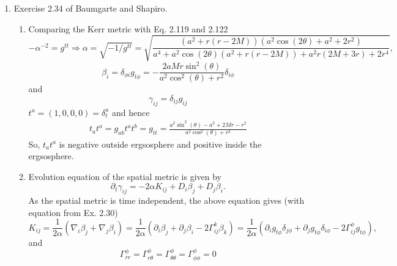 \documentclass[10pt]{article}
\begin{document}
\begin{enumerate}
\item Exercise 2.34 of Baumgarte and Shapiro.\\
  \begin{enumerate}
  \item Comparing the Kerr metric with Eq. 2.119 and 2.122 
    \begin{equation}
      \label{eq:metric-in-alpha-beta}
      -\alpha^{-2} = g^{tt} \Rightarrow \alpha = \sqrt{-1/g^{tt}} = \sqrt{\frac{\left(a^2+r (r-2 M)\right) \left(a^2 \cos (2 \theta )+a^2+2 r^2\right)}{a^4+a^2 \cos (2 \theta ) \left(a^2+r (r-2 M)\right)+a^2 r (2 M+3 r)+2 r^4}},
    \end{equation}
    \begin{equation}
      \label{eq:beta}
      \beta_i = \delta_{\phi i} g_{t\phi} = -\frac{2 a M r \sin ^2(\theta )}{a^2 \cos ^2(\theta )+r^2}\delta_{i\phi}
    \end{equation}
    and
    \begin{equation}
      \label{eq:gamma}
      \gamma_{ij} = \delta_{ij}g_{ij}
    \end{equation}
    $t^a = (1, 0, 0, 0) = \delta^a_t$ and hence
    \begin{align}
      \label{eq:tnorm}
      t_at^a = g_{ab}t^at^b = g_{tt} = \frac{a^2 \sin ^2(\theta )-a^2+2 M r-r^2}{a^2 \cos ^2(\theta )+r^2}
    \end{align}
    So, $t_at^a$ is negative outside ergsosphere and positive inside the ergsosphere.
  \item Evolution equation of the spatial metric is given by
    \begin{equation}
      \label{eq:evolution-of-spatial-metric}
      \partial_t\gamma_{ij} = -2\alpha K_{ij} + D_i\beta_j + D_j\beta_i.
    \end{equation}
    As the spatial metric is time independent, the above equation gives (with equation from Ex. 2.30)
    \begin{equation}
      \label{eq:extrinsic-metric}
      K_{ij} = \frac{1}{2\alpha}(\nabla_i\beta_j + \nabla_j\beta_i) = \frac{1}{2\alpha}(\partial_i\beta_j + \partial_j\beta_i - 2 \Gamma_{ij}^k \beta_k) = \frac{1}{2\alpha}(\partial_ig_{t\phi}\delta_{j\phi} + \partial_jg_{t\phi}\delta_{i\phi} - 2\Gamma_{ij}^\phi g_{t\phi}) ,
    \end{equation}
    and
    \begin{equation}
      \label{eq:christofell}
      \Gamma^\phi_{rr} = \Gamma^\phi_{r\theta} = \Gamma^\phi_{\theta\theta} = \Gamma^\phi_{\phi\phi} = 0
    \end{equation}

\end{enumerate}
\end{enumerate}
\end{document}
